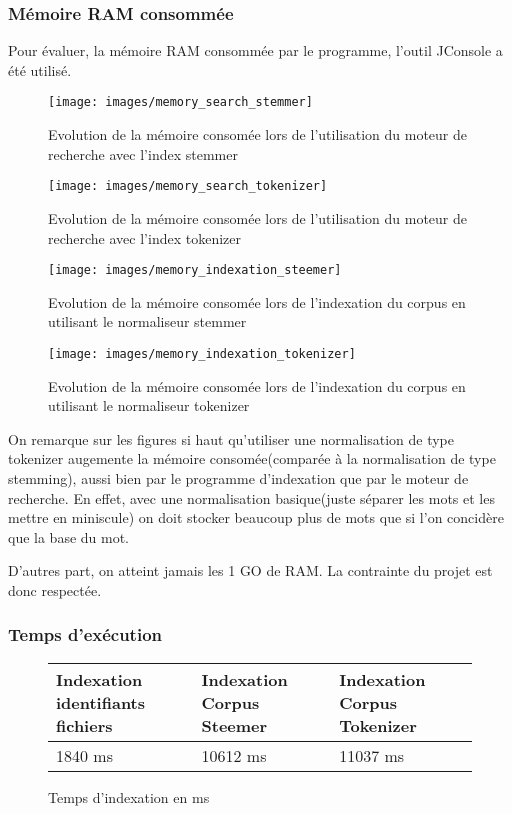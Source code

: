 \subsubsection{Mémoire RAM consommée}
\label{sec:performance}
Pour évaluer, la mémoire RAM consommée par le programme, l'outil JConsole a été utilisé.


\begin{figure}[H]
	\centering
	\texttt{[image: images/memory\_search\_stemmer]}
	\caption{Evolution de la mémoire consomée lors de l'utilisation du moteur de recherche avec l'index stemmer}
	\label{fig:memory_search_stemmer}
\end{figure}
\begin{figure}[H]
	\centering
	\texttt{[image: images/memory\_search\_tokenizer]}
	\caption{Evolution de la mémoire consomée lors de l'utilisation du moteur de recherche avec l'index tokenizer}
	\label{fig:memory_search_tokenizer}
\end{figure}
\begin{figure}[H]
	\centering
	\texttt{[image: images/memory\_indexation\_steemer]}
	\caption{Evolution de la mémoire consomée lors de l'indexation du corpus en utilisant le normaliseur stemmer}
	\label{fig:memory_indexation_stemmer}
\end{figure}
\begin{figure}[H]
	\centering
	\texttt{[image: images/memory\_indexation\_tokenizer]}
	\caption{Evolution de la mémoire consomée lors de l'indexation du corpus en utilisant le normaliseur tokenizer}
	\label{fig:memory_indexation_tokenizer}
\end{figure}



On remarque sur les figures si haut qu'utiliser une normalisation de type tokenizer augemente la mémoire consomée(comparée à la normalisation de type stemming), aussi bien par le programme d'indexation que par le moteur de recherche. En effet, avec une normalisation basique(juste séparer les mots et les mettre en miniscule) on doit stocker beaucoup plus de mots que si l'on concidère que la base du mot.

D'autres part, on atteint jamais les 1 GO de RAM. La contrainte du projet est donc respectée.

\subsubsection{Temps d'exécution}

\begin{figure}[H]
	\begin{tabular}{|l|l|l|}
		\hline
		Indexation identifiants fichiers & Indexation Corpus Steemer & Indexation Corpus Tokenizer\\
		\hline
		1840 ms& 10612 ms& 11037 ms\\
		\hline
	\end{tabular}
	\caption{Temps d'indexation en ms}
	\label{tab:indexation_time}
\end{figure}

